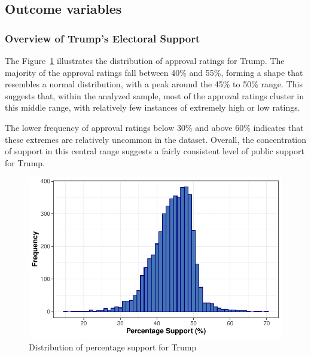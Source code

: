 \documentclass[
  letterpaper,
  DIV=11,
  numbers=noendperiod]{scrartcl}
\begin{document}
\hypertarget{outcome-variables}{%
\subsection{Outcome variables}\label{outcome-variables}}

\hypertarget{overview-of-trumps-electoral-support}{%
\subsubsection{Overview of Trump's Electoral
Support}\label{overview-of-trumps-electoral-support}}

The Figure~\ref{fig-pct} illustrates the distribution of approval
ratings for Trump. The majority of the approval ratings fall between
40\% and 55\%, forming a shape that resembles a normal distribution,
with a peak around the 45\% to 50\% range. This suggests that, within
the analyzed sample, most of the approval ratings cluster in this middle
range, with relatively few instances of extremely high or low ratings.

The lower frequency of approval ratings below 30\% and above 60\%
indicates that these extremes are relatively uncommon in the dataset.
Overall, the concentration of support in this central range suggests a
fairly consistent level of public support for Trump.

\begin{figure}

{\centering \includegraphics{Insights-and-Predictions-for-the-U.S.-Election_files/figure-pdf/fig-pct-1.pdf}

}

\caption{\label{fig-pct}Distribution of percentage support for Trump}

\end{figure}
\end{document}
